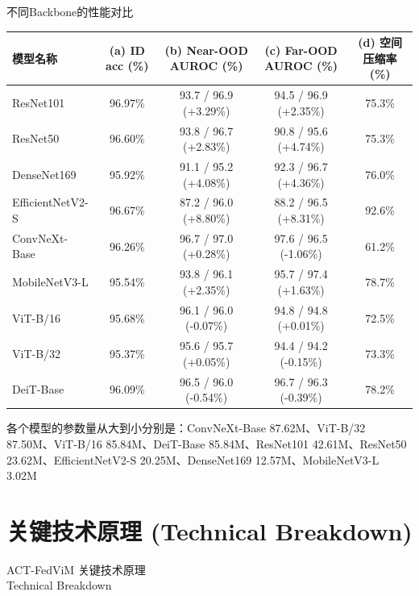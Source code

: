 \documentclass[11pt,aspectratio=169]{beamer}
\begin{document}
\begin{frame}[fragile]{不同Backbone的性能对比}
  \scriptsize
  \setlength{\tabcolsep}{4pt}
  \renewcommand{\arraystretch}{1.15}
  \begin{tabular}{lcccc}
    \hline
    模型名称 &
    (a) ID acc (\%) &
    (b) Near-OOD AUROC (\%)  &
    (c) Far-OOD AUROC (\%)  &
    (d) 空间压缩率 (\%) \\
    \hline
    ResNet101 & 96.97\% & 93.7 / 96.9 (+3.29\%) & 94.5 / 96.9 (+2.35\%) & 75.3\% \\
    ResNet50 & 96.60\% & 93.8 / 96.7 (+2.83\%) & 90.8 / 95.6 (+4.74\%) & 75.3\% \\
    DenseNet169 & 95.92\% & 91.1 / 95.2 (+4.08\%) & 92.3 / 96.7 (+4.36\%) & 76.0\% \\
    EfficientNetV2-S & 96.67\% & 87.2 / 96.0 (+8.80\%) & 88.2 / 96.5 (+8.31\%) & 92.6\% \\
    ConvNeXt-Base & 96.26\% & 96.7 / 97.0 (+0.28\%) & 97.6 / 96.5 (-1.06\%) & 61.2\% \\
    MobileNetV3-L & 95.54\% & 93.8 / 96.1 (+2.35\%) & 95.7 / 97.4 (+1.63\%) & 78.7\% \\
    ViT-B/16 & 95.68\% & 96.1 / 96.0 (-0.07\%) & 94.8 / 94.8 (+0.01\%) & 72.5\% \\
    ViT-B/32 & 95.37\% & 95.6 / 95.7 (+0.05\%) & 94.4 / 94.2 (-0.15\%) & 73.3\% \\
    DeiT-Base & 96.09\% & 96.5 / 96.0 (-0.54\%) & 96.7 / 96.3 (-0.39\%) & 78.2\% \\
    \hline
  \end{tabular}

  \vspace{0.6em}
  {\scriptsize 各个模型的参数量从大到小分别是：ConvNeXt-Base 87.62M、ViT-B/32 87.50M、ViT-B/16 85.84M、DeiT-Base 85.84M、ResNet101 42.61M、ResNet50 23.62M、EfficientNetV2-S 20.25M、DenseNet169 12.57M、MobileNetV3-L 3.02M}
\end{frame}

\section{关键技术原理 (Technical Breakdown)}

\begin{frame}{ACT-FedViM}
  \centering
  \vfill
  {\LARGE 关键技术原理\\[0.5em]}
  {\large Technical Breakdown}
  \vfill
\end{frame}
\end{document}
